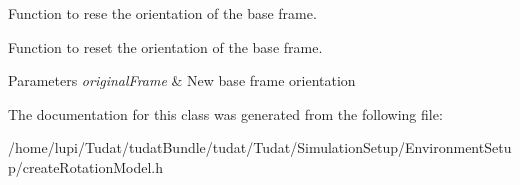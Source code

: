 Function to rese the orientation of the base frame. 

Function to reset the orientation of the base frame. 
\begin{DoxyParams}{Parameters}
{\em original\+Frame} & New base frame orientation \\
\hline
\end{DoxyParams}


The documentation for this class was generated from the following file\+:\begin{DoxyCompactItemize}
\item 
/home/lupi/\+Tudat/tudat\+Bundle/tudat/\+Tudat/\+Simulation\+Setup/\+Environment\+Setup/create\+Rotation\+Model.\+h\end{DoxyCompactItemize}
